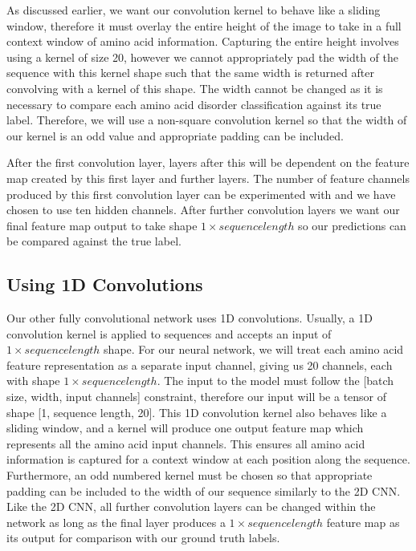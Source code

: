\documentclass{l4proj}
\begin{document}
As discussed earlier, we want our convolution kernel to behave like a sliding window, therefore it must overlay the entire height of the image to take in a full context window of amino acid information. Capturing the entire height involves using a kernel of size 20, however we cannot appropriately pad the width of the sequence with this kernel shape such that the same width is returned after convolving with a kernel of this shape. The width cannot be changed as it is necessary to compare each amino acid disorder classification against its true label. Therefore, we will use a non-square convolution kernel so that the width of our kernel is an odd value and appropriate padding can be included. 

After the first convolution layer, layers after this will be dependent on the feature map created by this first layer and further layers. The number of feature channels produced by this first convolution layer can be experimented with and we have chosen to use ten hidden channels. After further convolution layers we want our final feature map output to take shape $1\times sequence length$ so our predictions can be compared against the true label. 

\subsection*{Using 1D Convolutions}

Our other fully convolutional network uses 1D convolutions. Usually, a 1D convolution kernel is applied to sequences and accepts an input of $1\times sequence length$ shape. For our neural network, we will treat each amino acid feature representation as a separate input channel, giving us 20 channels, each with shape $1\times sequence length$. The input to the model must follow the [batch size, width, input channels] constraint, therefore our input will be a tensor of shape [1, sequence length, 20]. This 1D convolution kernel also behaves like a sliding window, and a kernel will produce one output feature map which represents all the amino acid input channels. This ensures all amino acid information is captured for a context window at each position along the sequence. Furthermore, an odd numbered kernel must be chosen so that appropriate padding can be included to the width of our sequence similarly to the 2D CNN. Like the 2D CNN, all further convolution layers can be changed within the network as long as the final layer produces a $1\times sequence length$ feature map as its output for comparison with our ground truth labels.
\end{document}
